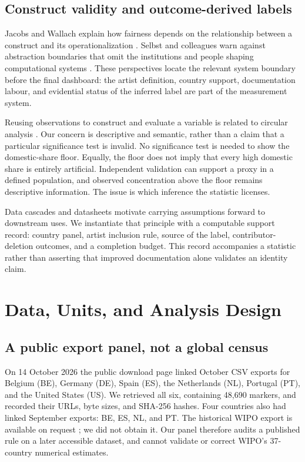 \subsection{Construct validity and outcome-derived labels}
Jacobs and Wallach explain how fairness depends on the relationship between a construct and its operationalization \cite{jacobs2021}. Selbst and colleagues warn against abstraction boundaries that omit the institutions and people shaping computational systems \cite{selbst2019}. These perspectives locate the relevant system boundary before the final dashboard: the artist definition, country support, documentation labour, and evidential status of the inferred label are part of the measurement system.

Reusing observations to construct and evaluate a variable is related to circular analysis \cite{circular2009}. Our concern is descriptive and semantic, rather than a claim that a particular significance test is invalid. No significance test is needed to show the domestic-share floor. Equally, the floor does not imply that every high domestic share is entirely artificial. Independent validation can support a proxy in a defined population, and observed concentration above the floor remains descriptive information. The issue is which inference the statistic licenses.

Data cascades \cite{cascades2021} and datasheets \cite{gebru2021} motivate carrying assumptions forward to downstream uses. We instantiate that principle with a computable support record: country panel, artist inclusion rule, source of the label, contributor-deletion outcomes, and a completion budget. This record accompanies a statistic rather than asserting that improved documentation alone validates an identity claim.

\section{Data, Units, and Analysis Design}
\subsection{A public export panel, not a global census}
On 14 October 2026 the public download page linked October CSV exports for Belgium (BE), Germany (DE), Spain (ES), the Netherlands (NL), Portugal (PT), and the United States (US). We retrieved all six, containing 48,690 markers, and recorded their URLs, byte sizes, and SHA-256 hashes. Four countries also had linked September exports: BE, ES, NL, and PT. The historical WIPO export is available on request \cite{sacwipo}; we did not obtain it. Our panel therefore audits a published rule on a later accessible dataset, and cannot validate or correct WIPO's 37-country numerical estimates.

